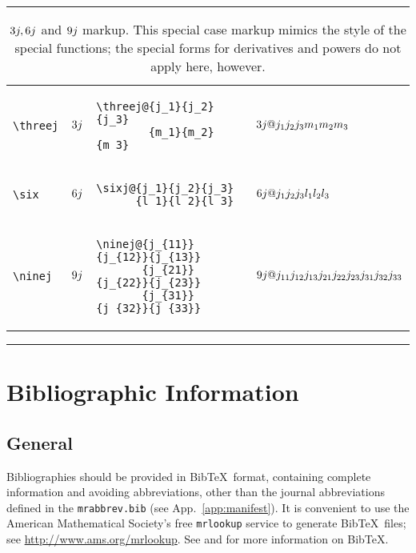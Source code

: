 \documentclass[twoside]{article}
\newcommand{\token}[1]{\texttt{#1}}
\newcommand{\BibTeX}{Bib\TeX}
\newenvironment{Table}[1]{%
   \begin{table}[htb]\hrule\begin{centering}\caption{#1}}{%
   \par\end{centering}\hrule\end{table}}
\newenvironment{Tabular}[1]{%
   \begingroup\def\arraystretch{1.3}\small \begin{tabular}{#1}}{%
   \end{tabular}\endgroup}
\begin{document}
\begin{Table}{$\threej, \sixj$ and $\ninej$ markup\label{tab:threejmarkup}.
This special case markup mimics the style of the special functions;
the special forms for derivatives and powers do not apply here, however.}
\begin{Tabular}{llll}
\verb|\threej| & $\threej$ &
\begin{minipage}[t]{2in}
\begin{verbatim}
\threej@{j_1}{j_2}{j_3}
        {m_1}{m_2}{m_3}
\end{verbatim}
\end{minipage}
  & $\threej@{j_1}{j_2}{j_3}{m_1}{m_2}{m_3}$ \\
\verb|\six| & $\sixj$ &
\begin{minipage}[t]{2in}
\begin{verbatim}
\sixj@{j_1}{j_2}{j_3}
      {l_1}{l_2}{l_3}
\end{verbatim}
\end{minipage}
  & $\sixj@{j_1}{j_2}{j_3}{l_1}{l_2}{l_3}$ \\
\verb|\ninej| & $\ninej$ &
\begin{minipage}[t]{2.2in}
\begin{verbatim}
\ninej@{j_{11}}{j_{12}}{j_{13}}
       {j_{21}}{j_{22}}{j_{23}}
       {j_{31}}{j_{32}}{j_{33}}
\end{verbatim}
\end{minipage}
  & $\ninej@{j_{11}}{j_{12}}{j_{13}}{j_{21}}{j_{22}}{j_{23}}{j_{31}}{j_{32}}{j_{33}}$ \\
\end{Tabular}
\end{Table}

\section{Bibliographic Information}\label{sec:bib}
\subsection{General}
Bibliographies should be provided in \BibTeX\ format,  containing complete information
and avoiding abbreviations, other than the journal abbreviations
defined in the \token{mrabbrev.bib} (see App.~\ref{app:manifest}).
It is convenient to use the American Mathematical Society's free 
\token{mrlookup} service to generate \BibTeX\ files; see
\url{http://www.ams.org/mrlookup}.
See \cite[App.~B]{Lamport:1985:LDP} and \cite{Goossens:1994:LC} for more information
on \BibTeX.
\end{document}
